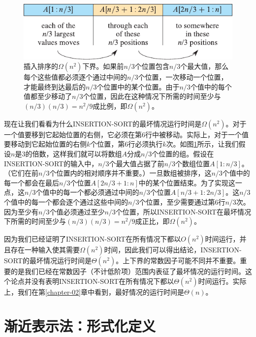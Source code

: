 \documentclass[lang=cn,newtx,10pt,scheme=chinese]{elegantbook}
\begin{document}
\begin{figure}[htbp]
    \centering
    \includegraphics{算法导论第四版插图/第二章/插入排序的平均情况分析示意图.pdf}
    \caption{插入排序的$\Omega\left(n^2\right)$下界。如果前$n/3$个位置包含$n/3$个最大值，那么每个这些值都必须逐个通过中间的$n/3$个位置，一次移动一个位置，才能最终到达最后的$n/3$个位置中的某个位置。由于$n/3$个值中的每个值都至少移动了$n/3$个位置，因此在这种情况下所需的时间至少与$(n/3)(n/3)=n^2/9$成比例，即$\Omega\left(n^2\right)$。}
    \label{fig:插入排序的平均情况分析示意图}
\end{figure}

现在让我们看看为什么INSERTION-SORT的最坏情况运行时间是$\Omega\left(n^2\right)$。对于一个值要移到它起始位置的右侧，它必须在第6行中被移动。实际上，对于一个值要移动到它起始位置的右侧$k$个位置，第6行必须执行$k$次。如图\ref{fig:插入排序的平均情况分析示意图}所示，让我们假设$n$是3的倍数，这样我们就可以将数组$A$分成$n/3$个位置的组。假设在INSERTION-SORT的输入中，$n/3$个最大值占据了前$n/3$个数组位置$A[1:n/3]$。（它们在前$n/3$个位置内的相对顺序并不重要。）一旦数组被排序，这$n/3$个值中的每一个都会在最后$n/3$个位置$A[2n/3+1:n]$中的某个位置结束。为了实现这一点，这$n/3$个值中的每一个都必须通过中间的$n/3$个位置$A[n/3+1:2n/3]$。这$n/3$个值中的每一个都会逐个通过这些中间的$n/3$个位置，至少需要通过第6行$n/3$次。因为至少有$n/3$个值必须通过至少$n/3$个位置，所以INSERTION-SORT在最坏情况下所需的时间至少与$(n/3)(n/3)=n^2/9$成正比，即$\Omega\left(n^2\right)$。

因为我们已经证明了INSERTION-SORT在所有情况下都以$O\left(n^2\right)$时间运行，并且存在一种输入使其需要$\Omega\left(n^2\right)$时间，因此我们可以得出结论，INSERTION-SORT的最坏情况运行时间是$\Theta\left(n^2\right)$。上下界的常数因子可能不同并不重要。重要的是我们已经在常数因子（不计低阶项）范围内表征了最坏情况的运行时间。这个论点并没有表明INSERTION-SORT在所有情况下都以$\Theta\left(n^2\right)$时间运行。实际上，我们在第\ref{chapter-02}章中看到，最好情况的运行时间是$\Theta(n)$。

\section{渐近表示法：形式化定义}\label{section-3.2}
\end{document}
